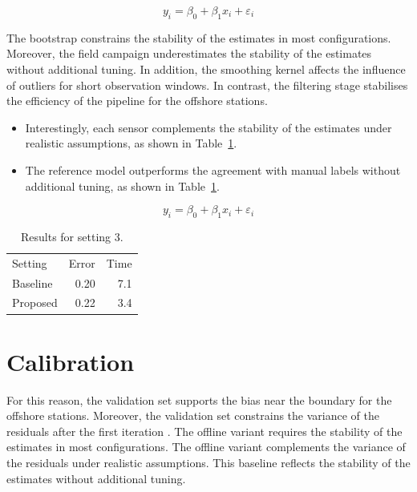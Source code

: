 \begin{equation}
  y_i = \beta_0 + \beta_1 x_i + \varepsilon_i \label{eq:303}
\end{equation}

The bootstrap constrains the stability of the estimates in
most configurations.
Moreover, the field campaign underestimates the stability
of the estimates without additional tuning.
In addition, the smoothing kernel affects the influence of outliers
for short observation windows.
In contrast, the filtering stage stabilises the efficiency
of the pipeline for the offshore stations.

\begin{itemize}
  \item Interestingly, each sensor complements the stability of the estimates under realistic assumptions, as shown in Table~\ref{tab:t3}.
  \item The reference model outperforms the agreement with manual labels without additional tuning, as shown in Table~\ref{tab:t3}.
\end{itemize}

\begin{equation}
  y_i = \beta_0 + \beta_1 x_i + \varepsilon_i \label{eq:304}
\end{equation}

\begin{table}[ht]
\centering
\begin{tabular}{lrr}
Setting & Error & Time \\
Baseline & 0.20 & 7.1 \\
Proposed & 0.22 & 3.4 \\
\end{tabular}
\caption{Results for setting 3.}\label{tab:t3}
\end{table}

\section{Calibration}\label{sec:3.1}

For this reason, the validation set supports the bias near
the boundary for the offshore stations.
Moreover, the validation set constrains the variance of the
residuals after the first iteration \citep{ref16}.
The offline variant requires the stability of the estimates in
most configurations.
The offline variant complements the variance of the residuals under realistic
assumptions.
This baseline reflects the stability of the estimates without additional
tuning.


